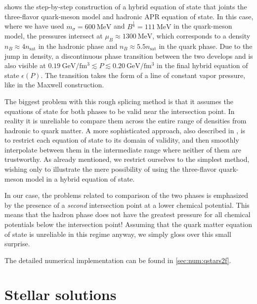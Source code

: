  shows the step-by-step construction of a hybrid equation of state that joints the three-flavor quark-meson model and hadronic APR equation of state.
In this case, where we have used $m_\sigma=\SI{600}{\mega\electronvolt}$ and $B^\frac14 = \SI{111}{\mega\electronvolt}$ in the quark-meson model,
the pressures intersect at $\mu_B \approx \SI{1300}{\mega\electronvolt}$, which corresponds to a density $n_B \approx 4 n_\text{sat}$ in the hadronic phase and $n_B \approx 5.5 n_\text{sat}$ in the quark phase.
Due to the jump in density, a discontinuous phase transition between the two develops and is also visible at $\SI{0.19}{\giga\electronvolt\per\femto\meter\cubed} \lesssim P \lesssim \SI{0.20}{\giga\electronvolt\per\femto\meter\cubed}$ in the final hybrid equation of state $\epsilon(P)$.
The transition takes the form of a line of constant vapor pressure, like in the Maxwell construction.

The biggest problem with this rough splicing method is that it assumes the equations of state for both phases to be valid near the intersection point.
In reality it is unreliable to compare them across the entire range of densities from hadronic to quark matter.
A more sophisticated approach, also described in \cite[section V-F]{ref:quark_star_review},
is to restrict each equation of state to its domain of validity,
and then smoothly interpolate between them in the intermediate range where neither of them are trustworthy.
As already mentioned, we restrict ourselves to the simplest method,
wishing only to illustrate the mere possibility of using the three-flavor quark-meson model in a hybrid equation of state.

In our case,
the problems related to comparison of the two phases is emphasized by the presence of a \emph{second} intersection point at a lower chemical potential.
This means that the hadron phase does not have the greatest pressure for all chemical potentials below the intersection point!
Assuming that the quark matter equation of state is unreliable in this regime anyway, we simply gloss over this small surprise.

The detailed numerical implementation can be found in \cref{sec:num:qstars2f}.

\section{Stellar solutions}


